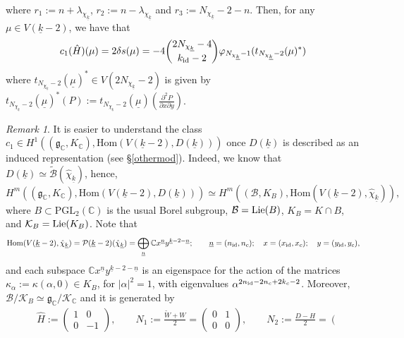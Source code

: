 \documentclass{amsart}
\theoremstyle{definition}
\theoremstyle{remark}
\newtheorem{remark}[theorem]{Remark}
\numberwithin{equation}{section}
\newcommand{\PGL}{{\mathrm{PGL}}}
\newcommand{\C}{{\mathbb C}}
\newcommand{\cB}{{\mathcal B}}
\newcommand{\cK}{{\mathcal K}}
\newcommand{\cP}{{\mathcal P}}
\newcommand{\mfg}{{\mathfrak g}}
\newcommand{\Hom}{{\mathrm {Hom}}}
\begin{document}
where $r_1:=n+\lambda_{\chi_{\underline k}}$, $r_2:=n-\lambda_{\chi_{\underline k}}$ and $r_3:=N_{\chi_{\underline k}}-2-n$. Then, for any $\mu\in V(\underline{k}-2)$, we have that 
\begin{equation}\label{descc1C}
c_1(\hat H)(\mu)=2\delta s(\mu)=-4\binom{2N_{\chi_{\underline k}}-4}{k_{\rm id}-2}\varphi_{N_{\chi_{\underline k}}-1}(t_{N_{\chi_{\underline k}}-2}(\mu)^*)
\end{equation}
where $t_{N_{\chi_{\underline k}}-2}(\underline{\mu})^*\in V(2N_{\chi_{\underline k}}-2)$ is given by
$t_{N_{\chi_{\underline k}}-2}(\underline{\mu})^*(P):=t_{N_{\chi_{\underline k}}-2}(\underline{\mu})\left(\frac{\partial^2 P}{\partial x\partial y}\right)$.
\begin{remark}\label{Altdescc1}
    It is easier to understand the class $c_1\in H^1((\mfg_\C,K_\C),\Hom(V(\underline k-2),D({\underline k})))$ once $D(\underline k)$ is described as an induced representation (see \S \ref{othermod}). Indeed, we know that $D(\underline k)\simeq \tilde \cB(\hat\chi_{\underline k})$, hence,
    \begin{equation}\label{ShapiroGK}
    H^m((\mfg_\C,K_\C),\Hom(V(\underline k-2),D({\underline k})))\simeq H^m((\cB,K_B),\Hom(V(\underline k-2),\hat\chi_{\underline k})),
    \end{equation}
    where $B\subset\PGL_2(\C)$ is the usual Borel subgroup, $\cB={\rm Lie}(B)$, $K_B=K\cap B$, and $\cK_B={\rm Lie}(K_B)$. Note that 
    \[
    \Hom(V(\underline k-2),\hat\chi_{\underline k})=\cP(\underline k-2)(\hat\chi_{\underline k})=\bigoplus_{\underline n}\C x^{\underline n}y^{\underline k-2-\underline n};\qquad \underline n=(n_{\rm id},n_c);\quad x=(x_{\rm id},x_c);\quad y=(y_{\rm id},y_c),
    \]
    and each subspace $\C x^{\underline n}y^{\underline k-2-\underline n}$ is an eigenspace for the action of the matrices $\kappa_\alpha:=\kappa(\alpha,0)\in K_B$, for $|\alpha|^2=1$, with eigenvalues $\alpha^{2n_{\rm id}-2n_c+2k_c-2}$. Moreover, $\cB/\cK_B\simeq \mfg_\C/\cK_\C$ and it is generated by 
\begin{eqnarray*}
&&\hat H:=\left(\begin{array}{cc}
       1  & 0 \\
        0 & -1
    \end{array}\right), \qquad N_1:=\frac{\tilde W+W}{2}=\left(\begin{array}{cc}
       0  & 1 \\
        0 & 0
    \end{array}\right), \qquad N_2:=\frac{D-H}{2}=\left(\begin{array}{cc}

\end{array}
\end{eqnarray*}
\end{remark}
\end{document}
